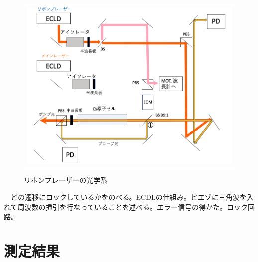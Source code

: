 \documentclass[uplatex, dvipdfmx, a4paper, report, papersize, 11pt]{jsbook}
\begin{document}
\begin{figure}[htpb]
\begin{tabular}{c}
      \begin{minipage}{1\hsize}
        \centering
          \includegraphics[keepaspectratio,  scale=0.35,  angle=0]
                          {figures/saturated-absorption/repump_diagram.png}
                          \caption{リポンプレーザーの光学系}
                          \label{repump_diagram}
      \end{minipage}
    \end{tabular}
\end{figure}
　どの遷移にロックしているかをのべる。ECDLの仕組み。ピエゾに三角波を入れて周波数の挿引を行なっていることを述べる。エラー信号の得かた。ロック回路。
\section{測定結果}
\end{document}
